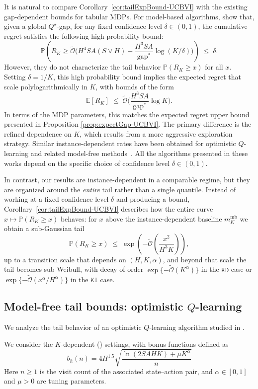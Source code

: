 \documentclass[11pt]{article}
\newcommand{\PP}{\mathbb{P}}
\newcommand{\KD} {\texttt{KD}}
\newcommand{\KI} {\texttt{KI}}
\newcommand{\gapstar}{\mathrm{gap}^*}
\begin{document}
It is natural to compare Corollary~\ref{cor:tailExpBound-UCBVI} with the existing gap-dependent bounds for tabular MDPs. For model-based algorithms, \citet{simchowitz2019non} show that,  given a global $Q^\star$-gap, for any fixed confidence level $\delta \in (0,1)$, the cumulative regret satisfies the following high-probability bound:
\[
\PP\left(R_K \ge \tilde{\mathcal O}\!\Big(H^4SA(S\vee H) + 
\frac{H^3SA}{\gapstar}
\log (K/\delta)
\Big)\right)
\;\le\;
\delta.
\]
However, they do not characterize the tail behavior $\PP(R_K\ge x)$ for all $x$. Setting $\delta=1/K$, this high probability bound implies the expected regret that scale polylogarithmically in $K$, with bounds of the form
\[
\mathbb E[R_K]
\;\le\;
\tilde{\mathcal O}\!\Big(
\frac{H^3SA}{\gapstar}
\log K
\Big).
\]
In terms of the MDP parameters, this matches the expected regret upper bound presented in Proposition \ref{prop:expectGap-UCBVI}. The primary difference is the refined dependence on $K$, which results from a more aggressive exploration strategy. Similar instance-dependent rates have been obtained for optimistic $Q$-learning and related model-free methods~\citep{yang2021q,velegkas2022reinforcement}. All the algorithms presented in these works depend on the specific choice of confidence level $\delta\in(0,1)$.

In contrast, our results are instance-dependent in a comparable regime, but they are organized around the \emph{entire} tail rather than a single quantile. 
Instead of working at a fixed confidence level $\delta$ and producing a bound, Corollary~\ref{cor:tailExpBound-UCBVI} describes how the entire curve $x\mapsto\PP(R_K\ge x)$ behaves:
for $x$ above the instance-dependent baseline $m_K^{\mathrm{mb}}$ we obtain a sub-Gaussian tail
\[
\PP(R_K\ge x)
\;\le\;
\exp\!\left(-\tilde{\mathcal O}\left(\frac{x^2}{H^3 K}\right)\right),
\]
up to a transition scale that depends on $(H,K,\alpha)$, and beyond that scale the tail becomes sub-Weibull, with decay of order $\exp\{-\tilde{\mathcal O}(K^\alpha)\}$ in the $\KD$ case or $\exp\{-\tilde{\mathcal O}(x^\alpha/H^\alpha)\}$ in the $\KI$ case.

\subsection{Model-free tail bounds: optimistic $Q$-learning}\label{sec:MF}
We analyze the tail behavior of an optimistic $Q$-learning algorithm studied in \citep{jin2018q, yang2021q}.

We consider the $K$-dependent (\text{\KD}) settings, with bonus functions defined as
\[
    b_h(n) = 4 H^{1.5} \sqrt{\dfrac{\ln(2SAHK)+\mu K^\alpha}{n}}
\]
Here $n\ge 1$ is the visit count of the associated state--action pair, and $\alpha\in[0,1]$ and $\mu>0$ are tuning parameters.
\end{document}
